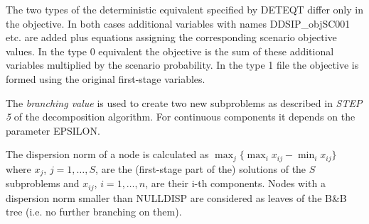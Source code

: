 \documentclass[11pt,draft]{article}
\newcommand{\+}{{\ti{+}}}
\newcommand{\1}{{\ti{1}}}
\begin{document}
The two types of the deterministic equivalent specified by DETEQT differ only in the objective.
In both cases additional variables with names DDSIP\_objSC001 etc. are added plus equations assigning the corresponding scenario objective values.
In the type 0 equivalent the objective is the sum of these additional variables multiplied by the scenario probability.
In the type 1 file the objective is formed using the original first-stage variables.

The {\it branching value} is used to create two new subproblems as described in {\em STEP 5} of the
decomposition algorithm. For continuous components it depends on the parameter EPSILON.

The dispersion norm of a node is calculated as $\max_{j}  \{  \max_{i}
x_{ij} - \min_{i} x_{ij}\}$ where $x_j$, $j=1,\ldots,S$, are the (first-stage part of the) solutions
of the $S$ subproblems and $x_{ij}$, $i=1,\ldots,n$, are their i-th components.
Nodes with a dispersion norm smaller than NULLDISP are considered as leaves of the 
B\&B tree (i.e. no further branching on them).
\end{document}
